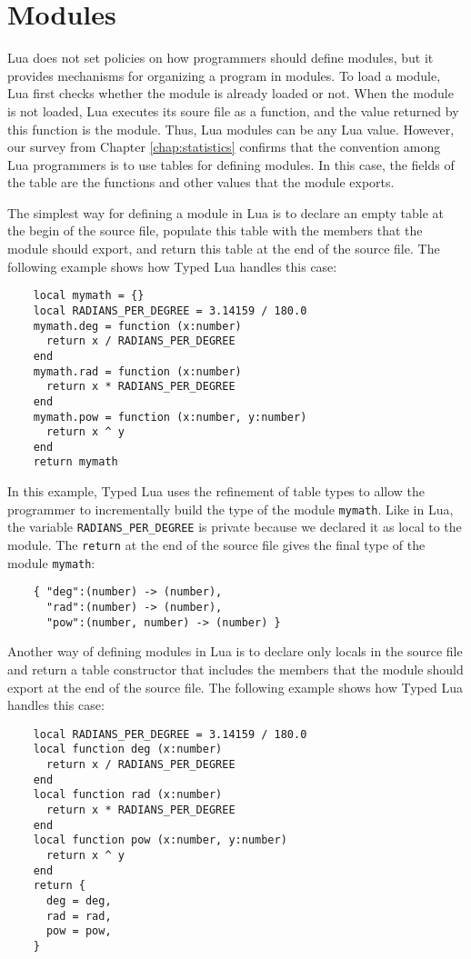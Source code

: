\section{Modules}

Lua does not set policies on how programmers should define modules,
but it provides mechanisms for organizing a program in modules.
To load a module, Lua first checks whether the module is already
loaded or not.
When the module is not loaded, Lua executes its soure file as a
function, and the value returned by this function is the module.
Thus, Lua modules can be any Lua value.
However, our survey from Chapter \ref{chap:statistics} confirms that
the convention among Lua programmers is to use tables for defining modules. 
In this case, the fields of the table are the functions and other
values that the module exports.

The simplest way for defining a module in Lua is to declare an
empty table at the begin of the source file,
populate this table with the members that the module should export,
and return this table at the end of the source file. 
The following example shows how Typed Lua handles this case:
\begin{verbatim}
    local mymath = {}
    local RADIANS_PER_DEGREE = 3.14159 / 180.0
    mymath.deg = function (x:number)
      return x / RADIANS_PER_DEGREE
    end
    mymath.rad = function (x:number)
      return x * RADIANS_PER_DEGREE
    end
    mymath.pow = function (x:number, y:number)
      return x ^ y
    end
    return mymath
\end{verbatim}

In this example, Typed Lua uses the refinement of table types to
allow the programmer to incrementally build the type of the
module \texttt{mymath}.
Like in Lua, the variable \texttt{RADIANS\string_PER\string_DEGREE}
is private because we declared it as local to the module. 
The \texttt{return} at the end of the source file gives the
final type of the module \texttt{mymath}:
\begin{verbatim}
    { "deg":(number) -> (number),
      "rad":(number) -> (number),
      "pow":(number, number) -> (number) }
\end{verbatim}

Another way of defining modules in Lua is to declare only locals
in the source file and return a table constructor that includes
the members that the module should export at the end of the source file.
The following example shows how Typed Lua handles this case:
\begin{verbatim}
    local RADIANS_PER_DEGREE = 3.14159 / 180.0
    local function deg (x:number)
      return x / RADIANS_PER_DEGREE
    end
    local function rad (x:number)
      return x * RADIANS_PER_DEGREE
    end
    local function pow (x:number, y:number)
      return x ^ y
    end
    return {
      deg = deg,
      rad = rad,
      pow = pow,
    }
\end{verbatim}

